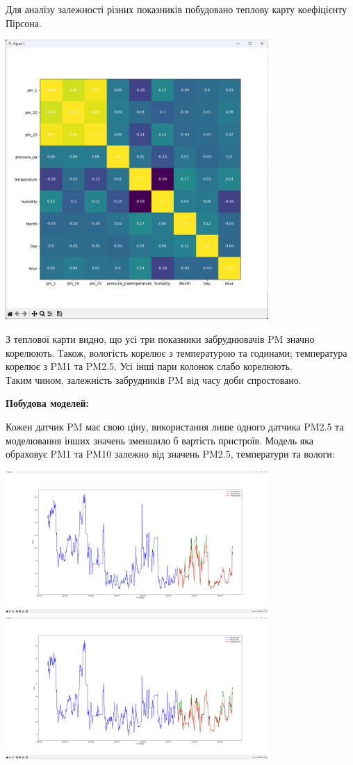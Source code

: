 \documentclass{article}
\begin{document}
Для аналізу залежності різних показників побудовано теплову карту коефіцієнту Пірсона.\\\indent
\begin{center}
    \includegraphics[width=100mm]{corelation}
\end{center}

З теплової карти видно, що усі три показники забруднювачів PM значно корелюють. Також, вологість корелює з температурою та годинами; температура корелює з PM1 та PM2.5. Усі інші пари колонок слабо корелюють.\\\indent
Таким чином, залежність забрудників PM від часу доби спростовано.
\newpage


\textbf{Побудова моделей:}\\\indent

Кожен датчик PM має свою ціну, використання лише одного датчика PM2.5 та моделювання інших значень зменшило б вартість пристроїв. Модель яка обраховує PM1 та PM10 залежно від значень PM2.5, температури та вологи:\\\indent
\begin{center}
    \includegraphics[width=100mm]{pm1}
    \includegraphics[width=100mm]{pm10}
\end{center}
\end{document}
